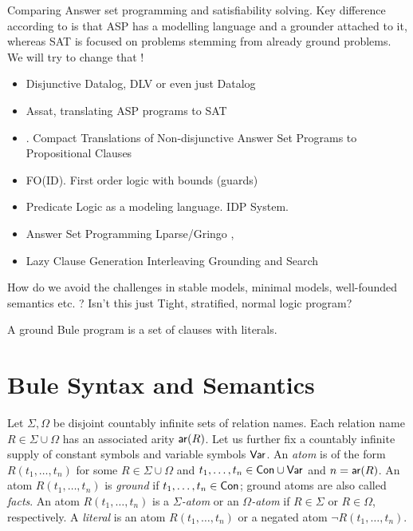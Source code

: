 \documentclass[conference]{IEEEtran}
\begin{document}
Comparing Answer set programming and satisfiability solving. Key difference
according to \cite{Lierler17} is that ASP has a modelling language and a
grounder attached to it, whereas SAT is focused on problems stemming from
already ground problems. We will try to change that !


\begin{itemize}
    \item Disjunctive Datalog, DLV \cite{Eiter97} or even just Datalog \cite{Gottlob89}
    \item Assat, translating ASP programs to SAT \cite{Lin04}
    \item \cite{Janhunen11}. Compact Translations of Non-disjunctive Answer Set
        Programs to Propositional Clauses
    \item FO(ID). First order logic with bounds (guards) \cite{Wittocx10}
    \item Predicate Logic as a modeling language. IDP System. \cite{Cat18}
    \item Answer Set Programming Lparse/Gringo \cite{Gebser15}, \cite{Ferraris05}
    \item Lazy Clause Generation Interleaving Grounding and Search \cite{Cat15}
\end{itemize}

How do we avoid the challenges in stable models, minimal models, well-founded
semantics etc. ?  Isn't this just Tight, stratified, normal logic program?


A ground Bule program is a set of clauses with literals. 

\section{\bcore}

\section{Bule Syntax and Semantics}

Let $\Sigma,\Omega$ be disjoint countably infinite sets of relation names. 
Each relation name $R\in \Sigma\cup\Omega$ has an associated arity $\mathsf{ar}(R)$. 
Let us further fix a countably infinite supply of constant symbols  and variable symbols $\mathsf{Var}$. 
An
\emph{atom} is of the form $R(t_1,\ldots,t_n)$ for some $R\in
\Sigma\cup\Omega$ and $t_1,\ldots,t_n\in\mathsf{Con}\cup\mathsf{Var}$ and
$n=\mathsf{ar}(R)$. An atom $R(t_1,\ldots,t_n)$ is \emph{ground} if
$t_1,\ldots,t_n\in\mathsf{Con}$; ground atoms are also called
\emph{facts}. An atom $R(t_1,\ldots,t_n)$ is a \emph{$\Sigma$-atom} or
an \emph{$\Omega$-atom} if $R\in \Sigma$ or $R\in \Omega$,
respectively. A \emph{literal} is an atom $R(t_1,\ldots,t_n)$ or a negated atom
$\neg R(t_1,\ldots,t_n)$. 
\end{document}
